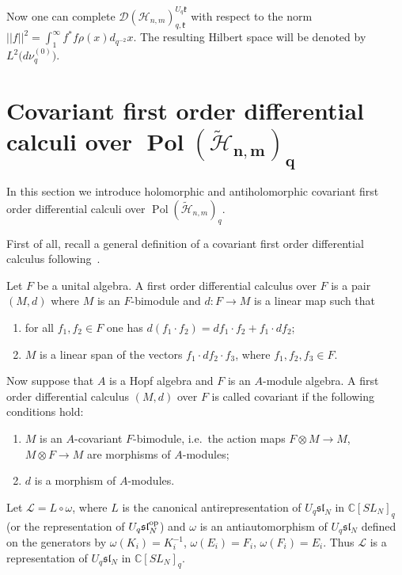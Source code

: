 \documentclass[11pt]{article}
\begin{document}
Now one can complete $\mathscr{D}(\mathscr{H}_{n,m})_{q,\mathfrak{k}}^{U_q \mathfrak{k}}$ with respect to the
norm $||f||^2=\int_1^\infty f^*f \rho(x)d_{q^{-2}}x$. The resulting Hilbert space will be denoted by
$L^2\big(d\nu_q^{(0)}\big)$.



\section[Covariant first order differential calculi over $\operatorname{Pol}(\widetilde{\mathscr{H}}_{n,m})_q$]{Covariant f\/irst order dif\/ferential calculi over $\boldsymbol{\operatorname{Pol}(\widetilde{\mathscr{H}}_{n,m})_q}$}
\label{sec_5}

In this section we introduce   holomorphic and antiholomorphic covariant f\/irst order dif\/ferential calculi
over $\operatorname{Pol}(\widetilde{\mathscr{H}}_{n,m})_q$.

First of all, recall a general def\/inition of a covariant f\/irst order dif\/ferential calculus fol\-lowing~\cite{Kl-Sch}.

Let $F$ be a unital algebra. A f\/irst order dif\/ferential calculus over $F$ is a pair $(M,d)$ where $M$ is an
$F$-bimodule and $d:F \rightarrow M$ is a linear map such that
\begin{enumerate}\itemsep=0pt
\item for all $f_1,f_2 \in F$ one has $d(f_1 \cdot f_2)=df_1 \cdot f_2+f_1 \cdot df_2$;
\item $M$ is a linear span of the vectors $f_1 \cdot df_2 \cdot f_3$, where $f_1,f_2,f_3 \in F$.
\end{enumerate}

Now suppose that $A$ is a Hopf algebra and $F$ is an $A$-module algebra. A f\/irst order dif\/ferential calculus
$(M,d)$ over $F$ is called covariant if the following conditions hold:
\begin{enumerate}\itemsep=0pt
\item $M$ is an $A$-covariant $F$-bimodule, i.e.\ the action maps $F \otimes M \rightarrow M$, $M \otimes F \rightarrow M$
are morphisms of $A$-modules;
\item $d$ is a morphism of $A$-modules.
\end{enumerate}

Let $\mathcal{L}=L \circ \omega$, where $L$ is the canonical antirepresentation of $U_q \mathfrak{sl}_N$ in
$\mathbb C[SL_N]_q$ (or the representation of $U_q \mathfrak{sl}_N^{\rm op}$) and $\omega$ is an
antiautomorphism of $U_q \mathfrak{sl}_N$ def\/ined on the generators by $\omega(K_i)=K_i^{-1}$,
$\omega(E_i)=F_i$, $\omega(F_i)=E_i$. Thus $\mathcal{L}$ is a representation of $U_q \mathfrak{sl}_N$ in
$\mathbb C[SL_N]_q$.
\end{document}
